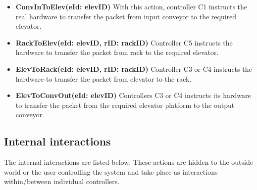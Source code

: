 \begin{itemize}
\item \textbf{ConvInToElev(eId: elevID)}
With this action, controller C1 instructs the real hardware to transfer the packet from input conveyor to the required elevator.

\item \textbf{RackToElev(eId: elevID, rID: rackID)}
Controller C5 instructs the hardware to transfer the packet from rack to the required elevator.

\item \textbf{ElevToRack(eId: elevID, rID: rackID)}
Controller C3 or C4 instructs the hardware to transfer the packet from elevator to the rack.

\item \textbf{ElevToConvOut(eId: elevID)}
Controllers C3 or C4 instructs its hardware to transfer the packet from the required elevator platform to the output conveyor.

\end{itemize}

\subsection*{Internal interactions}
The internal interactions are listed below. These actions are hidden to the outside world or the user controlling the system and take place as interactions within/between individual controllers.

